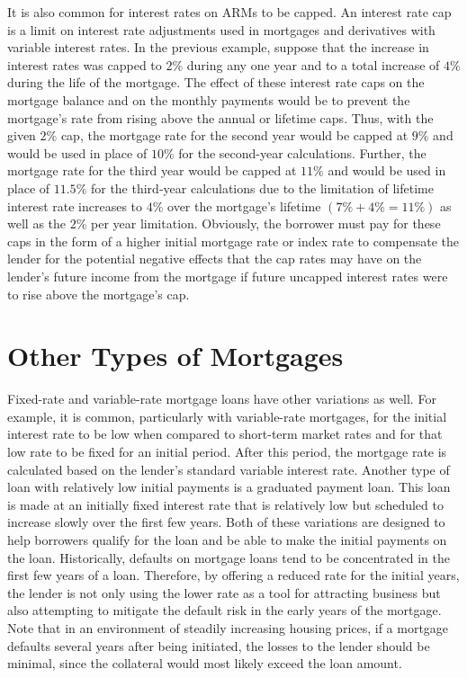 \documentclass[11pt]{article}
\begin{document}
It is also common for interest rates on ARMs to be capped. An interest rate cap is a limit on interest rate adjustments used in mortgages and derivatives with variable interest rates. In the previous example, suppose that the increase in interest rates was capped to $2 \%$ during any one year and to a total increase of $4 \%$ during the life of the mortgage. The effect of these interest rate caps on the mortgage balance and on the monthly payments would be to prevent the mortgage's rate from rising above the annual or lifetime caps. Thus, with the given $2 \%$ cap, the mortgage rate for the second year would be capped at $9 \%$ and would be used in place of $10 \%$ for the second-year calculations. Further, the mortgage rate for the third year would be capped at $11 \%$ and would be used in place of $11.5 \%$ for the third-year calculations due to the limitation of lifetime interest rate increases to $4 \%$ over the mortgage's lifetime $(7 \%+4 \%=11 \%)$ as well as the $2 \%$ per year limitation. Obviously, the borrower must pay for these caps in the form of a higher initial mortgage rate or index rate to compensate the lender for the potential negative effects that the cap rates may have on the lender's future income from the mortgage if future uncapped interest rates were to rise above the mortgage's cap.

\section*{Other Types of Mortgages}
Fixed-rate and variable-rate mortgage loans have other variations as well. For example, it is common, particularly with variable-rate mortgages, for the initial interest rate to be low when compared to short-term market rates and for that low rate to be fixed for an initial period. After this period, the mortgage rate is calculated based on the lender's standard variable interest rate. Another type of loan with relatively low initial payments is a graduated payment loan. This loan is made at an initially fixed interest rate that is relatively low but scheduled to increase slowly over the first few years. Both of these variations are designed to help borrowers qualify for the loan and be able to make the initial payments on the loan. Historically, defaults on mortgage loans tend to be concentrated in the first few years of a loan. Therefore, by offering a reduced rate for the initial years, the lender is not only using the lower rate as a tool for attracting business but also attempting to mitigate the default risk in the early years of the mortgage. Note that in an environment of steadily increasing housing prices, if a mortgage defaults several years after being initiated, the losses to the lender should be minimal, since the collateral would most likely exceed the loan amount.
\end{document}
